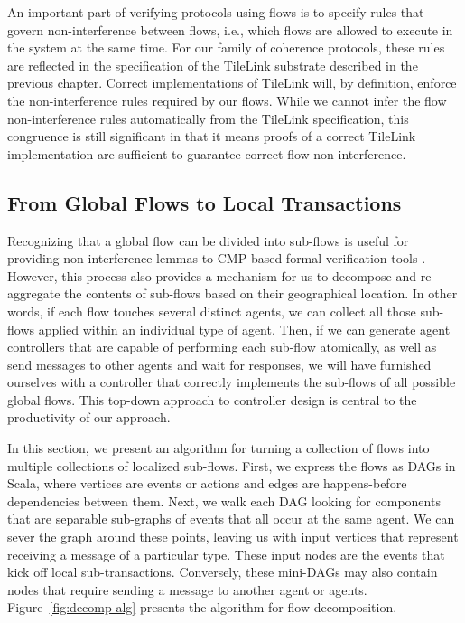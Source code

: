 An important part of verifying protocols using flows is to specify rules that govern non-interference between flows,
i.e., which flows are allowed to execute in the system at the same time.
For our family of coherence protocols, these rules are reflected in the specification of the TileLink substrate
described in the previous chapter.
Correct implementations of TileLink will, by definition, enforce the non-interference rules required by our flows.
While we cannot infer the flow non-interference rules automatically from the TileLink specification,
this congruence is still significant in that it means proofs of a correct TileLink implementation
are sufficient to guarantee correct flow non-interference.

\subsection{From Global Flows to Local Transactions}

Recognizing that a global flow can be divided into sub-flows is useful for providing non-interference lemmas to CMP-based formal verification tools \cite{oleary-fmcad09}.
However, this process also provides a mechanism for us to decompose and re-aggregate the contents of sub-flows based on their geographical location.
In other words, if each flow touches several distinct agents, 
we can collect all those sub-flows applied within an individual type of agent.
Then, if we can generate agent controllers that are capable of performing each sub-flow atomically,
as well as send messages to other agents and wait for responses,
we will have furnished ourselves with a controller that correctly implements the sub-flows of all
possible global flows.
This top-down approach to controller design is central to the productivity of our approach.

In this section, we present an algorithm for turning a collection of flows into multiple collections of localized sub-flows.
First, we express the flows as DAGs in Scala, where vertices are events or actions and edges are happens-before dependencies between them.
Next, we walk each DAG looking for components that are separable sub-graphs of events that all occur at the same agent.
We can sever the graph around these points, leaving us with input vertices that represent receiving a message of a particular type.
These input nodes are the events that kick off local sub-transactions.
Conversely, these mini-DAGs may also contain nodes that require sending a message to another agent or agents.
Figure~\ref{fig:decomp-alg} presents the algorithm for flow decomposition.

